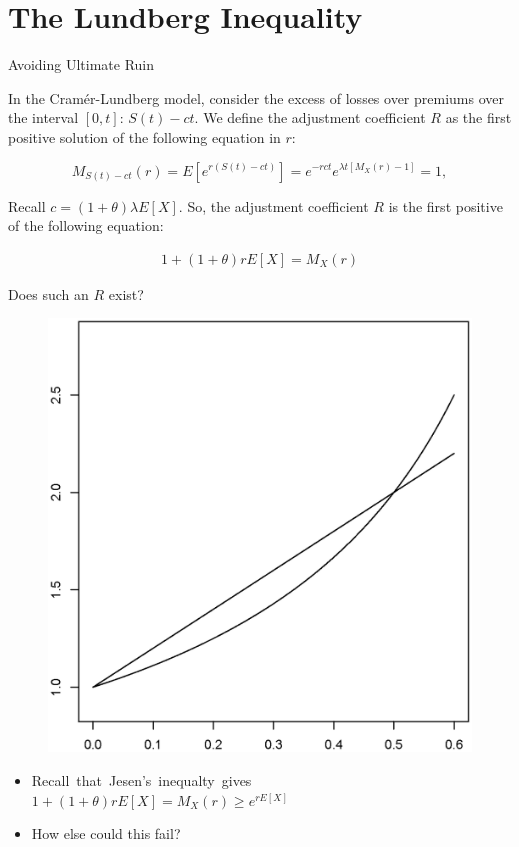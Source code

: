 \documentclass[11pt]{beamer}
\begin{document}
\section{The Lundberg Inequality}
\begin{frame}{Avoiding Ultimate Ruin}

In the Cram\'er-Lundberg model, consider the excess of losses over premiums over the interval $[0,t]$: $S(t)-ct.$ We define the \alert{adjustment coefficient $R$} as the first positive solution of the following equation in $r$:


$$M_{S(t)-ct}(r)=E\left[ e^{r(S(t)-ct)} \right]=e^{-rct}e^{\lambda t [M_X(r)-1]}=1,$$

\vfill

Recall $c = (1 + \theta) \lambda E[X]$. So, the adjustment coefficient $R$ is the first positive of the following equation:

\begin{eqnarray*}
1+(1+\theta) rE[X] = M_X(r)
\end{eqnarray*}



\end{frame}
\begin{frame}{Does such an $R$ exist?}

\begin{figure}
\centering
\includegraphics[scale=0.35]{Rplot}
\end{figure}
{\small
\begin{itemize}
\item Recall~that~Jesen's~inequalty~gives~$1+(1+\theta) rE[X] = M_X(r) \geq e^{rE[X]}$ 

\item How else could this fail?
\end{itemize}
}



\end{frame}
\end{document}
